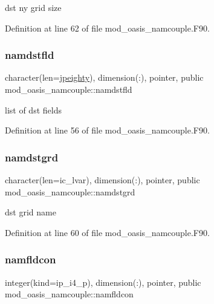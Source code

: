 dst ny grid size 



Definition at line 62 of file mod\+\_\+oasis\+\_\+namcouple.\+F90.

\mbox{\label{namespacemod__oasis__namcouple_ac4cfec209e4169b6098f9a8b9be1ffb1}} 
\subsubsection{\texorpdfstring{namdstfld}{namdstfld}}
{\footnotesize\ttfamily character(len=\hyperlink{namespacemod__oasis__namcouple_a4fb10ad6e864dcbe34c4a8b02204a523}{jpeighty}), dimension(\+:), pointer, public mod\+\_\+oasis\+\_\+namcouple\+::namdstfld}



list of dst fields 



Definition at line 56 of file mod\+\_\+oasis\+\_\+namcouple.\+F90.

\mbox{\label{namespacemod__oasis__namcouple_a7a2ed64b0670db38d2287f5d452060e4}} 
\subsubsection{\texorpdfstring{namdstgrd}{namdstgrd}}
{\footnotesize\ttfamily character(len=ic\+\_\+lvar), dimension(\+:), pointer, public mod\+\_\+oasis\+\_\+namcouple\+::namdstgrd}



dst grid name 



Definition at line 60 of file mod\+\_\+oasis\+\_\+namcouple.\+F90.

\mbox{\label{namespacemod__oasis__namcouple_a96aa6a31ef021468f807819a84b327c3}} 
\subsubsection{\texorpdfstring{namfldcon}{namfldcon}}
{\footnotesize\ttfamily integer(kind=ip\+\_\+i4\+\_\+p), dimension(\+:), pointer, public mod\+\_\+oasis\+\_\+namcouple\+::namfldcon}



